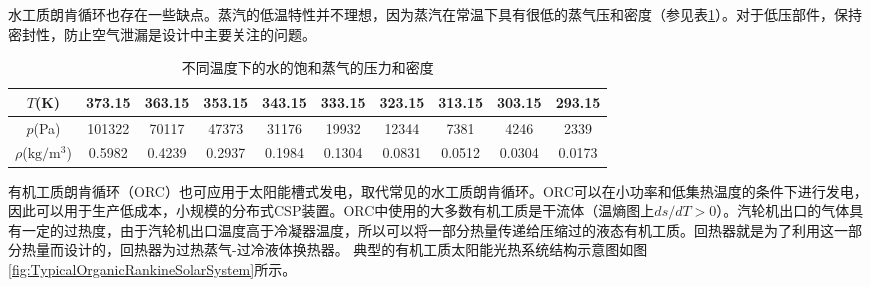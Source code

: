 水工质朗肯循环也存在一些缺点。蒸汽的低温特性并不理想，因为蒸汽在常温下具有很低的蒸气压和密度（参见表\ref{tab:waterT_P_D}）。对于低压部件，保持密封性，防止空气泄漏是设计中主要关注的问题。
\begin{table}[htbp]
\setlength{\abovecaptionskip}{-10pt}
	\caption{不同温度下的水的饱和蒸气的压力和密度}
	\begin{center}
	\begin{tabular}{cccccccccc}
		\toprule	
		    $T$(K)    &	373.15	    &    363.15    &    353.15    &    343.15    &    333.15    &    323.15    &    313.15    &    303.15    &    293.15\\
		\midrule	
		    $p$(Pa)    &    101322        &    70117    &    47373    &    31176    &    19932    &    12344    &    7381    &    4246    &    2339\\
		    $\rho$($\mathrm{kg/m^3}$)    &    0.5982        &    0.4239    &    0.2937    &    0.1984    &    0.1304    &    0.0831    &    0.0512    &    0.0304    &    0.0173\\
		\bottomrule
	\end{tabular}
	\end{center}
	\label{tab:waterT_P_D}
\end{table}

有机工质朗肯循环（ORC）也可应用于太阳能槽式发电，取代常见的水工质朗肯循环。ORC可以在小功率和低集热温度的条件下进行发电，因此可以用于生产低成本，小规模的分布式CSP装置。ORC中使用的大多数有机工质是干流体（温熵图上$ds/dT > 0$）。汽轮机出口的气体具有一定的过热度，由于汽轮机出口温度高于冷凝器温度，所以可以将一部分热量传递给压缩过的液态有机工质。回热器就是为了利用这一部分热量而设计的，回热器为过热蒸气-过冷液体换热器。
典型的有机工质太阳能光热系统结构示意图如图\ref{fig:TypicalOrganicRankineSolarSystem}所示。

